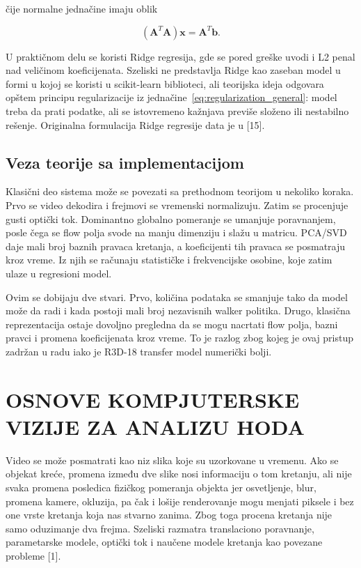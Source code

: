 ﻿\documentclass[12pt,a4paper]{report}
\begin{document}
čije normalne jednačine imaju oblik

\begin{equation}
(\mathbf{A}^T\mathbf{A})\mathbf{x}=\mathbf{A}^T\mathbf{b}.
\label{eq:normal_equations}
\end{equation}

U praktičnom delu se koristi Ridge regresija, gde se pored greške uvodi i L2 penal nad veličinom koeficijenata. Szeliski ne predstavlja Ridge kao zaseban model u formi u kojoj se koristi u scikit-learn biblioteci, ali teorijska ideja odgovara opštem principu regularizacije iz jednačine~\ref{eq:regularization_general}: model treba da prati podatke, ali se istovremeno kažnjava previše složeno ili nestabilno rešenje. Originalna formulacija Ridge regresije data je u [15].

\section{Veza teorije sa implementacijom}

Klasični deo sistema može se povezati sa prethodnom teorijom u nekoliko koraka. Prvo se video dekodira i frejmovi se vremenski normalizuju. Zatim se procenjuje gusti optički tok. Dominantno globalno pomeranje se umanjuje poravnanjem, posle čega se flow polja svode na manju dimenziju i slažu u matricu. PCA/SVD daje mali broj baznih pravaca kretanja, a koeficijenti tih pravaca se posmatraju kroz vreme. Iz njih se računaju statističke i frekvencijske osobine, koje zatim ulaze u regresioni model.

Ovim se dobijaju dve stvari. Prvo, količina podataka se smanjuje tako da model može da radi i kada postoji mali broj nezavisnih walker politika. Drugo, klasična reprezentacija ostaje dovoljno pregledna da se mogu nacrtati flow polja, bazni pravci i promena koeficijenata kroz vreme. To je razlog zbog kojeg je ovaj pristup zadržan u radu iako je R3D-18 transfer model numerički bolji.


\iffalse
\chapter{OSNOVE KOMPJUTERSKE VIZIJE ZA ANALIZU HODA}

Video se može posmatrati kao niz slika koje su uzorkovane u vremenu. Ako se
objekat kreće, promena između dve slike nosi informaciju o tom kretanju, ali nije
svaka promena posledica fizičkog pomeranja objekta jer osvetljenje, blur, promena
kamere, okluzija, pa čak i lošije renderovanje mogu menjati piksele i bez one
vrste kretanja koja nas stvarno zanima. Zbog toga procena kretanja nije samo
oduzimanje dva frejma. Szeliski razmatra translaciono poravnanje, parametarske
modele, optički tok i naučene modele kretanja kao povezane probleme [1].
\end{document}
